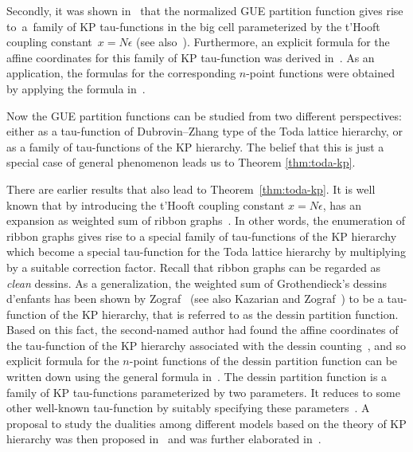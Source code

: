 \documentclass[pdftex]{sigma}
\newcommand{\e}{\epsilon}
\numberwithin{equation}{section}
\begin{document}
Secondly,
it was shown in~\cite{Zhou-GUE} that the normalized GUE partition function
\smash{$\frac{Z_N({\bf T};\e)}{Z_N({\bf 0};\e)}$}
gives rise to~a~family of KP tau-functions in the big cell parameterized by the
t'Hooft coupling constant~${x=N\e}$ (see also~\cite{KKN, KMMM, Morozov, Shaw-Tu-Yen}).
Furthermore,
an explicit formula for the affine coordinates for this family of KP tau-function was derived in~\cite{Zhou-GUE}.
As an application,
the formulas for the corresponding $n$-point functions were obtained by applying the formula in~\cite{Zhou-Emergent}.

Now the GUE partition functions can be studied from two different perspectives: either as a tau-function of Dubrovin--Zhang type of the Toda lattice hierarchy,
or as a family of tau-functions of the KP hierarchy.
The belief that this is just a special case of general phenomenon leads us to Theorem \ref{thm:toda-kp}.

There are earlier results that also lead to Theorem~\ref{thm:toda-kp}.
It is well known that by introducing the t'Hooft coupling constant $x= N\e$,
\smash{$\log \frac{Z_N({\bf T};\e)}{Z_N({\bf 0};\e)}$} has an expansion as weighted sum
of ribbon graphs~\cite{DY, HZ, Zhou-GUE}.
In other words, the enumeration of ribbon graphs gives rise to a special family of tau-functions
of the KP hierarchy which become a special tau-function for the Toda lattice hierarchy
by multiplying by a suitable correction factor.
Recall that ribbon graphs can be regarded as {\em clean} dessins.
As a generalization,
the weighted sum of Grothendieck's dessins d'enfants has
been shown by Zograf~\cite{Zograf} (see also Kazarian and Zograf~\cite{KZ})
to be a tau-function of the KP hierarchy, that is
referred to as the dessin partition function.
Based on this fact, the second-named author had found the affine coordinates
of the tau-function of the KP hierarchy associated with the dessin counting~\cite{Zhou-dessins},
and so explicit formula for the $n$-point functions of the dessin partition function
can be written down using the general formula in~\cite{Zhou-Emergent}.
The dessin partition function is a family of KP tau-functions parameterized by two parameters.
It reduces to some other well-known tau-function by suitably specifying these parameters~\cite{Zhou-dessins}.
A proposal to study the dualities among different models based on the theory of KP hierarchy
was then proposed in~\cite{Zhou-dessins} and was further elaborated in~\cite{Zhou-dessins2}.
\end{document}
